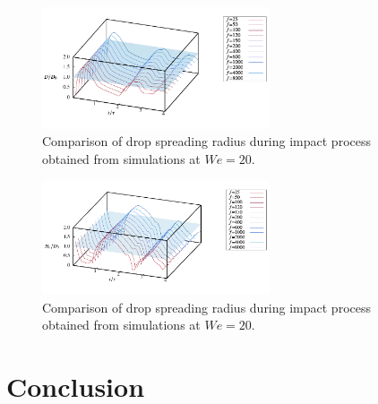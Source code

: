 \documentclass[lineno]{cls/jfm}
\begin{document}
 \begin{figure}
  \centerline{\includegraphics[width=0.6\textwidth]{fig/DropRHz.pdf}}
  \caption{Comparison of drop spreading radius during impact process obtained from simulations at $We=20$.}
 \label{fig:freq}
 \end{figure}

 \begin{figure}
  \centerline{\includegraphics[width=0.6\textwidth]{fig/DropHHz.pdf}}
  \caption{Comparison of drop spreading radius during impact process obtained from simulations at $We=20$.}
 \label{fig:freq}
 \end{figure}



\section{Conclusion}\label{sec:Conclusion}








\end{document}
